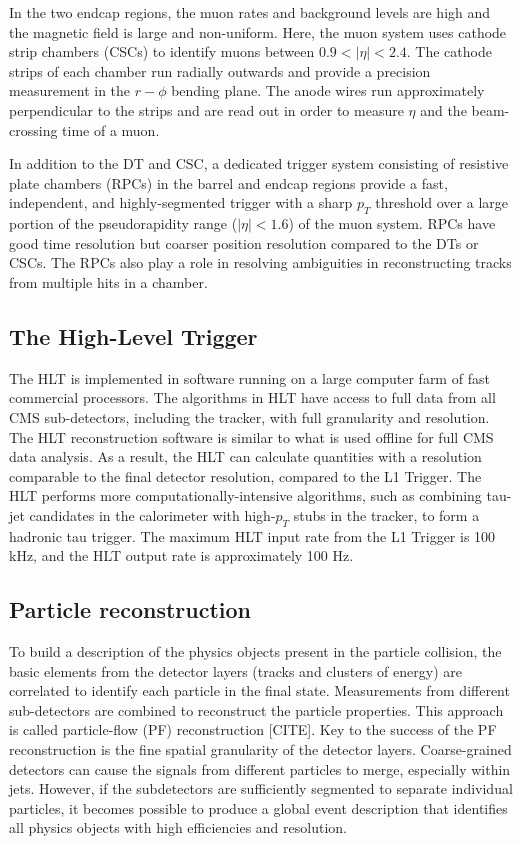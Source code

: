 In the two endcap regions, the muon rates and background levels are high and the magnetic field is large and non-uniform. Here, the muon system uses cathode strip chambers (CSCs) to identify muons between $0.9 < |\eta| < 2.4$. The cathode strips of each chamber run radially outwards and provide a precision measurement in the $r-\phi$ bending plane. The anode wires run approximately perpendicular to the strips and are read out in order to measure $\eta$ and the beam-crossing time of a muon. 

In addition to the DT and CSC, a dedicated trigger system consisting of resistive plate chambers (RPCs) in the barrel and endcap regions provide a fast, independent, and highly-segmented trigger with a sharp $p_T$ threshold over a large portion of the pseudorapidity range ($|\eta| < 1.6$) of the muon system. RPCs have good time resolution but coarser position resolution compared to the DTs or CSCs. The RPCs also play a role in resolving ambiguities in reconstructing tracks from multiple hits in a chamber. 

\subsection{The High-Level Trigger}
\label{section:phase-1-high-level-trigger}
The HLT is implemented in software running on a large computer farm of fast commercial processors. The algorithms in HLT have access to full data from all CMS sub-detectors, including the tracker, with full granularity and resolution. The HLT reconstruction software is similar to what is used offline for full CMS data analysis. As a result, the HLT can calculate quantities with a resolution comparable to the final detector resolution, compared to the L1 Trigger. The HLT performs more computationally-intensive algorithms, such as combining tau-jet candidates in the calorimeter with high-$p_T$ stubs in the tracker, to form a hadronic tau trigger. The maximum HLT input rate from the L1 Trigger is 100 kHz, and the HLT output rate is approximately 100 Hz. 

\subsection{Particle reconstruction}
To build a description of the physics objects present in the particle collision, the basic elements from the detector layers (tracks and clusters of energy) are correlated to identify each particle in the final state. Measurements from different sub-detectors are combined to reconstruct the particle properties. This approach is called particle-flow (PF) reconstruction [CITE]. Key to the success of the PF reconstruction is the fine spatial granularity of the detector layers. Coarse-grained detectors can cause the signals from different particles to merge, especially within jets. However, if the subdetectors are sufficiently segmented to separate individual particles, it becomes possible to produce a global event description that identifies all physics objects with high efficiencies and resolution.

